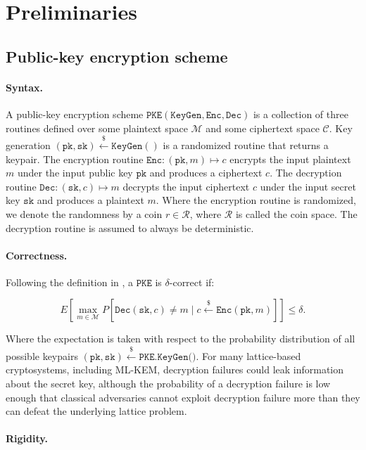 \documentclass[runningheads]{llncs}
\newcommand{\pke}{\texttt{PKE}}
\newcommand{\keygen}{\texttt{KeyGen}}
\newcommand{\encrypt}{\texttt{Enc}}
\newcommand{\decrypt}{\texttt{Dec}}
\newcommand{\pk}{\texttt{pk}}
\newcommand{\sk}{\texttt{sk}}
\newcommand{\leftsample}{\stackrel{\$}{\leftarrow}}
\begin{document}
\section{Preliminaries}\label{sec:preliminaries}

\subsection{Public-key encryption scheme}
\paragraph{Syntax.} A public-key encryption scheme $\pke(\keygen, \encrypt, \decrypt)$ is a collection of three routines defined over some plaintext space $\mathcal{M}$ and some ciphertext space $\mathcal{C}$. Key generation $(\pk, \sk) \leftsample \keygen()$ is a randomized routine that returns a keypair. The encryption routine $\encrypt: (\pk, m) \mapsto c$ encrypts the input plaintext $m$ under the input public key $\pk$ and produces a ciphertext $c$. The decryption routine $\decrypt: (\sk, c) \mapsto m$ decrypts the input ciphertext $c$ under the input secret key $\sk$ and produces a plaintext $m$. Where the encryption routine is randomized, we denote the randomness by a coin $r \in \mathcal{R}$, where $\mathcal{R}$ is called the coin space. The decryption routine is assumed to always be deterministic.

\paragraph{Correctness.} Following the definition in \cite{DBLP:conf/eurocrypt/DworkNR04}, a $\pke$ is $\delta$-correct if:

\begin{equation*}
    E\left[\max_{m \in \mathcal{M}} P\left[\decrypt(\sk, c) \neq m \mid c \leftsample \encrypt(\pk, m)\right]\right] \leq \delta.
\end{equation*}

Where the expectation is taken with respect to the probability distribution of all possible keypairs $(\pk, \sk) \leftsample \texttt{PKE.KeyGen()}$. For many lattice-based cryptosystems, including ML-KEM, decryption failures could leak information about the secret key, although the probability of a decryption failure is low enough that classical adversaries cannot exploit decryption failure more than they can defeat the underlying lattice problem.

\paragraph{Rigidity.} %
\end{document}
